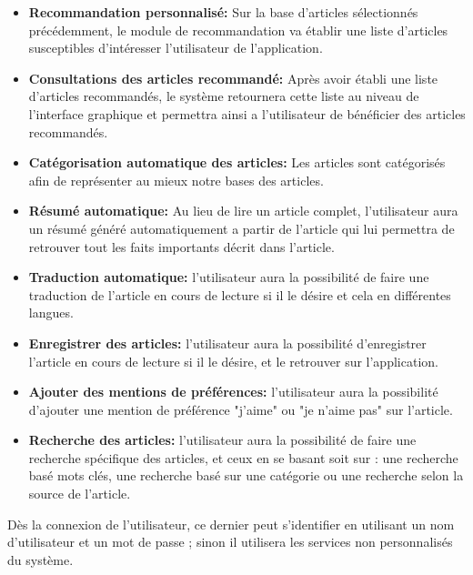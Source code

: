 \begin{itemize}
    
    \item \textbf{Recommandation personnalisé:}
    Sur la base d'articles sélectionnés précédemment, le module de recommandation va établir une liste d'articles susceptibles d'intéresser l'utilisateur de l'application.
    
    \item \textbf{Consultations des articles recommandé:}
    Après avoir établi une liste d'articles recommandés, le système retournera cette liste au niveau de l'interface graphique et permettra ainsi a l'utilisateur de bénéficier des articles recommandés.
        
    \item \textbf{Catégorisation automatique des articles:}
    Les articles sont catégorisés afin de représenter au mieux notre bases des articles.
    
    \item \textbf{Résumé automatique:}
    Au lieu de lire un article complet, l'utilisateur aura un résumé généré automatiquement a partir de l'article qui lui permettra de retrouver tout les faits importants décrit dans l'article.
    
    \item \textbf{Traduction automatique:}
    l'utilisateur aura la possibilité de faire une traduction de l'article en cours de lecture si il le désire et cela en différentes langues.

    \item \textbf{Enregistrer des articles:}
    l'utilisateur aura la possibilité d'enregistrer l'article en cours de lecture si il le désire, et le retrouver sur l'application.
    
    \item \textbf{Ajouter des mentions de préférences:}
    l'utilisateur aura la possibilité d'ajouter une mention de préférence "j'aime" ou "je n'aime pas" sur l'article.

    \item \textbf{Recherche des articles:}
    l'utilisateur aura la possibilité de faire une recherche spécifique des articles, et ceux en se basant soit sur : une recherche basé mots clés, une recherche basé sur une catégorie ou une recherche selon la source de l'article. 
    
\end{itemize}

Dès la connexion de l’utilisateur, ce dernier peut s’identifier en utilisant un nom d’utilisateur et un mot de passe ; sinon il utilisera les services non personnalisés du système.

